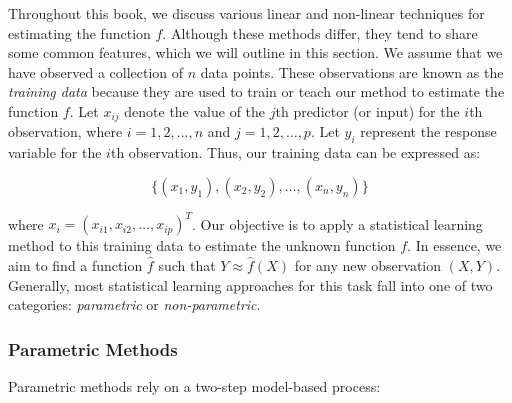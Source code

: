 Throughout this book, we discuss various linear and non-linear techniques for estimating the function $f$. Although these methods differ, they tend to share some common features, which we will outline in this section. We assume that we have observed a collection of $n$ data points. These observations are known as the \textit{training data} because they are used to train or teach our method to estimate the function $f$. Let $x_{ij}$ denote the value of the $j$th predictor (or input) for the $i$th observation, where $i = 1, 2, \ldots, n$ and $j = 1, 2, \ldots, p$. Let $y_i$ represent the response variable for the $i$th observation. Thus, our training data can be expressed as:

\[
\{(x_1, y_1), (x_2, y_2), \ldots, (x_n, y_n)\}
\]

where $x_i = (x_{i1}, x_{i2}, \ldots, x_{ip})^T$. Our objective is to apply a statistical learning method to this training data to estimate the unknown function $f$. In essence, we aim to find a function $\hat{f}$ such that $Y \approx \hat{f}(X)$ for any new observation $(X, Y)$. Generally, most statistical learning approaches for this task fall into one of two categories: \textit{parametric} or \textit{non-parametric}.

\subsubsection{Parametric Methods}

Parametric methods rely on a two-step model-based process:

